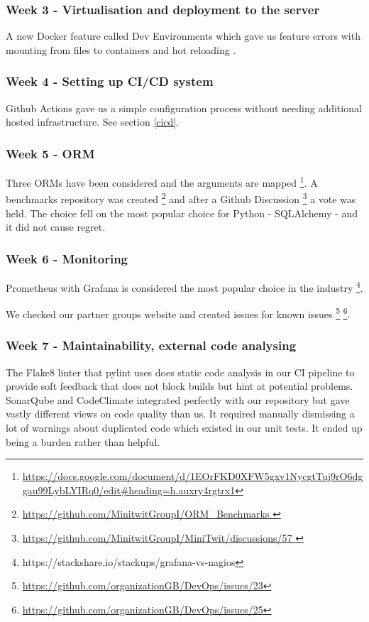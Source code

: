 \documentclass{article}
\begin{document}
\subsubsection{Week 3 - Virtualisation and deployment to the server}

A new Docker feature called Dev Environments which gave us feature errors with mounting from files to containers and hot reloading .  

\subsubsection{Week 4 - Setting up CI/CD system }

Github Actions gave us a simple configuration process without needing additional hosted infrastructure. See section \ref{cicd}. 

\subsubsection{Week 5 - ORM }

Three ORMs have been considered and the arguments are mapped \footnote{\url{https://docs.google.com/document/d/1EOrFKD0XFW5gxv1NycgtTuj9rO6dggau99LybLYIRq0/edit\#heading=h.auxry4rgtrx1}}. A benchmarks repository was created \footnote{\url{https://github.com/MinitwitGroupI/ORM_Benchmarks }} and after a Github Discussion \footnote{\url{https://github.com/MinitwitGroupI/MiniTwit/discussions/57 }} a vote was held. The choice fell on the most popular choice for Python - SQLAlchemy - and it did not cause regret. 

\subsubsection{Week 6 - Monitoring }

Prometheus with Grafana is considered the most popular choice in the industry \footnote{https://stackshare.io/stackups/grafana-vs-nagios}. 

We checked our partner groups website and created issues for known issues \footnote{\url{https://github.com/organizationGB/DevOps/issues/23}} \footnote{\url{https://github.com/organizationGB/DevOps/issues/25}}. 


\subsubsection{Week 7 - Maintainability, external code analysing }

The Flake8 linter that pylint uses does static code analysis in our CI pipeline to provide soft feedback that does not block builds but hint at potential problems. SonarQube and CodeClimate integrated perfectly with our repository but gave vastly different views on code quality than us. It required manually dismissing a lot of warnings about duplicated code which existed in our unit tests. It ended up being a burden rather than helpful.
\end{document}
